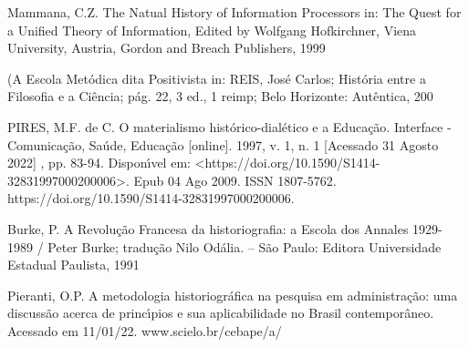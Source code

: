\documentclass[
12pt,		%
openright,	%
twoside,  %
a4paper,			%
chapter=TITLE,		%
english,			%
french,				%
spanish,			%
brazil				%
]{USPSC-classe/USPSC}
\begin{document}
\begin{flushleft}
\begin{flushleft}
[MAMMANA, 1999] Mammana, C.Z. The Natual History of Information Processors in: The Quest for a Unified Theory of Information, Edited by Wolfgang Hofkirchner, Viena University, Austria, Gordon and Breach Publishers, 1999
\end{flushleft}


\end{flushleft}


\begin{flushleft}
\begin{flushleft}
[REIS , 2006] (A Escola Met\'odica dita Positivista in: REIS, Jos\'e Carlos; Hist\'oria entre a Filosofia e a Ci\^encia; p\'ag. 22, 3 ed., 1 reimp; Belo Horizonte: Aut\^entica, 200
\end{flushleft}


\end{flushleft}


\begin{flushleft}
\begin{flushleft}
[Pires, 2009] PIRES, M.F. de C. O materialismo hist\'orico-dial\'etico e a Educa\c{c}\~ao. Interface - Comunica\c{c}\~ao, Sa\'ude, Educa\c{c}\~ao [online]. 1997, v. 1, n. 1 [Acessado 31 Agosto 2022] , pp. 83-94. Dispon\'{\i}vel em: <https://doi.org/10.1590/S1414-32831997000200006>. Epub 04 Ago 2009. ISSN 1807-5762. https://doi.org/10.1590/S1414-32831997000200006.
\end{flushleft}


\end{flushleft}


\begin{flushleft}
\begin{flushleft}
[Burke, 1991] Burke, P. A Revolu\c{c}\~ao Francesa da historiografia: a Escola dos Annales 1929-1989 / Peter Burke; tradu\c{c}\~ao Nilo Od\'alia. – S\~ao Paulo: Editora Universidade Estadual Paulista, 1991
\end{flushleft}


\end{flushleft}


\begin{flushleft}
\begin{flushleft}
[PIERANTI, 2022] Pieranti, O.P. A metodologia historiogr\'afica na pesquisa em administra\c{c}\~ao: uma discuss\~ao acerca de princ\'{\i}pios e sua aplicabilidade no Brasil contempor\^aneo. Acessado em 11/01/22. www.scielo.br/cebape/a/
\end{flushleft}


\end{flushleft}
\end{document}
